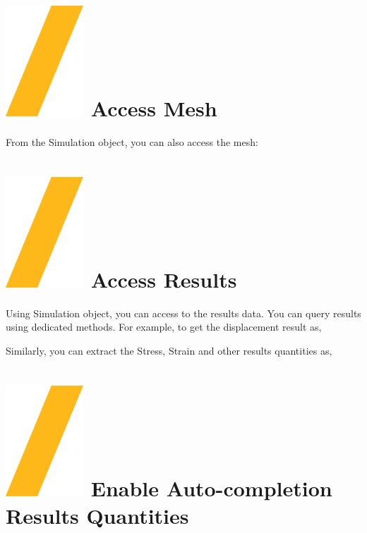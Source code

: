 \documentclass[9pt,landscape]{article}
\begin{document}
\begin{multicols}{3}

\section{\includegraphics[height=\fontcharht\font`\S]{slash.png} Access Mesh}

From the Simulation object, you can also access the mesh:



\section{\includegraphics[height=\fontcharht\font`\S]{slash.png} Access Results}

Using Simulation object, you can access to the results data. You can query results using dedicated methods.
For example, to get the displacement result as,


Similarly, you can extract the Stress, Strain and other results quantities as,



\vfill

\section{\includegraphics[height=\fontcharht\font`\S]{slash.png} Enable Auto-completion Results Quantities}


\end{multicols}
\end{document}
